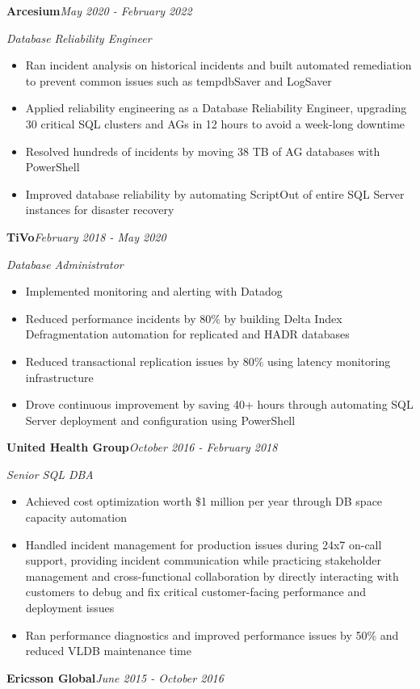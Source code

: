 \documentclass[10pt,a4paper]{article}
\begin{document}
\vspace{14.7pt}
\noindent\textbf{Arcesium}\hfill \textit{May 2020 - February 2022}

\textit{Database Reliability Engineer}\\[-5pt]
\begin{itemize}
  \item Ran incident analysis on historical incidents and built automated remediation to prevent common issues such as tempdbSaver and LogSaver
  \item Applied reliability engineering as a Database Reliability Engineer, upgrading 30 critical SQL clusters and AGs in 12 hours to avoid a week-long downtime
  \item Resolved hundreds of incidents by moving 38 TB of AG databases with PowerShell
  \item Improved database reliability by automating ScriptOut of entire SQL Server instances for disaster recovery
\end{itemize}
\vspace{14.7pt}
\noindent\textbf{TiVo}\hfill \textit{February 2018 - May 2020}

\textit{Database Administrator}\\[-5pt]
\begin{itemize}
  \item Implemented monitoring and alerting with Datadog
  \item Reduced performance incidents by 80\% by building Delta Index Defragmentation automation for replicated and HADR databases
  \item Reduced transactional replication issues by 80\% using latency monitoring infrastructure
  \item Drove continuous improvement by saving 40+ hours through automating SQL Server deployment and configuration using PowerShell
\end{itemize}
\vspace{14.7pt}
\noindent\textbf{United Health Group}\hfill \textit{October 2016 - February 2018}

\textit{Senior SQL DBA}\\[-5pt]
\begin{itemize}
  \item Achieved cost optimization worth \$1 million per year through DB space capacity automation
  \item Handled incident management for production issues during 24x7 on-call support, providing incident communication while practicing stakeholder management and cross-functional collaboration by directly interacting with customers to debug and fix critical customer-facing performance and deployment issues
  \item Ran performance diagnostics and improved performance issues by 50\% and reduced VLDB maintenance time
\end{itemize}
\vspace{14.7pt}
\noindent\textbf{Ericsson Global}\hfill \textit{June 2015 - October 2016}
\end{document}
